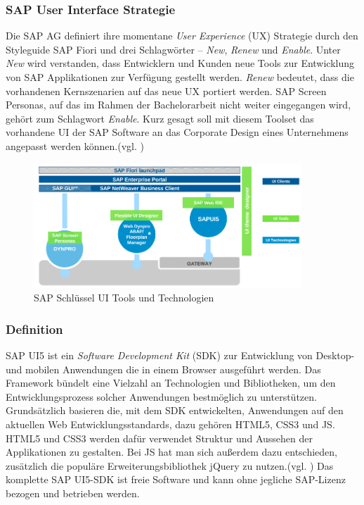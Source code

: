 \subsubsection{SAP User Interface Strategie}
Die SAP AG definiert ihre momentane \textit{User Experience} (UX) Strategie durch den Styleguide SAP Fiori und drei Schlagwörter -- \textit{New}, \textit{Renew} und \textit{Enable}. Unter \textit{New} wird verstanden, dass Entwicklern und Kunden neue Tools zur Entwicklung von SAP Applikationen zur Verfügung gestellt werden. \textit{Renew} bedeutet, dass die vorhandenen Kernszenarien auf das neue UX portiert werden. SAP Screen Personas, auf das im Rahmen der Bachelorarbeit nicht weiter eingegangen wird, gehört zum Schlagwort \textit{Enable}. Kurz gesagt soll mit diesem Toolset das vorhandene UI der SAP Software an das Corporate Design eines Unternehmens angepasst werden können.(vgl. \cite{SAPUX})

\vspace{1em}
\begin{figure}[htb]
  \centering
  \includegraphics[width=0.9\textwidth]{abb/sap_key_ui_tools}
  \caption[SAP Schlüssel UI Tools und Technologien]{SAP Schlüssel UI Tools und Technologien \cite{SAPUXPDF}}
  \label{fig:sapkeyuitools}
\end{figure}

\subsubsection{Definition}
SAP UI5 ist ein \textit{Software Development Kit} (SDK) zur Entwicklung von Desktop- und mobilen Anwendungen die in einem Browser ausgeführt werden. Das Framework bündelt eine Vielzahl an Technologien und Bibliotheken, um den Entwicklungsprozess solcher Anwendungen bestmöglich zu unterstützen. Grundsätzlich basieren die, mit dem SDK entwickelten, Anwendungen auf den aktuellen Web Entwicklungsstandards, dazu gehören HTML5, CSS3 und JS. HTML5 und CSS3 werden dafür verwendet Struktur und Aussehen der Applikationen zu gestalten. Bei JS hat man sich außerdem dazu entschieden, zusätzlich die populäre Erweiterungsbibliothek jQuery zu nutzen.(vgl. \cite{BuiltWith2014}) Das komplette SAP UI5-SDK ist freie Software und kann ohne jegliche SAP-Lizenz bezogen und betrieben werden.

